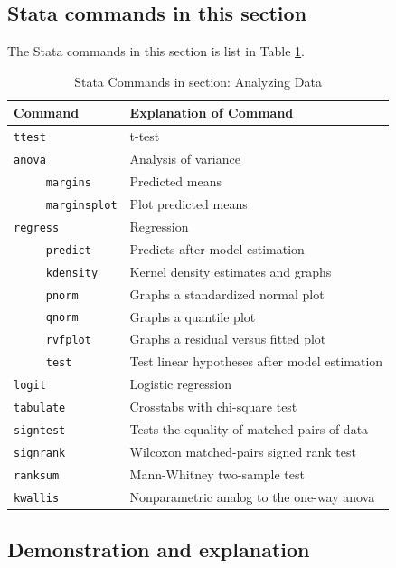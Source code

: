 \documentclass{article}
\begin{document}
\subsection{Stata commands in this section}
The Stata commands in this section is list in Table \ref{tab:cmds in section 5}.
\begin{table}[htbp]
  \centering
  \caption{ Stata Commands in section: Analyzing Data\label{tab:cmds in section 5}}
    \begin{tabular}{ll}
    \toprule
    Command & Explanation of Command \\
    \midrule
    \lstinline{ttest} & t-test \\
    \lstinline{anova} & Analysis of variance \\
    \lstinline{     margins} & Predicted means \\
    \lstinline{     marginsplot} & Plot predicted means \\
    \lstinline{regress} & Regression \\
    \lstinline{     predict} & Predicts after model estimation \\
    \lstinline{     kdensity} & Kernel density estimates and graphs \\
    \lstinline{     pnorm} & Graphs a standardized normal plot \\
    \lstinline{     qnorm} & Graphs a quantile plot \\
    \lstinline{     rvfplot} & Graphs a residual versus fitted plot \\
    \lstinline{     test} & Test linear hypotheses after model estimation \\
    \lstinline{logit} & Logistic regression \\
    \lstinline{tabulate} & Crosstabs with chi-square test \\
    \lstinline{signtest} & Tests the equality of matched pairs of data \\
    \lstinline{signrank} & Wilcoxon matched-pairs signed rank test \\
    \lstinline{ranksum} & Mann-Whitney two-sample test \\
    \lstinline{kwallis} & Nonparametric analog to the one-way anova \\
    \bottomrule
    \end{tabular}%
\end{table}%

\subsection{Demonstration and explanation}
\end{document}

